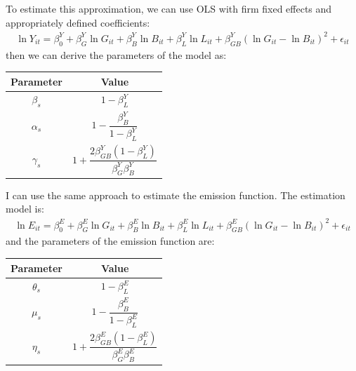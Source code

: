 \documentclass[12pt]{article} %
\begin{document}
To estimate this approximation, we can use OLS with firm fixed effects and appropriately defined coefficients:
\begin{gather*}
    \ln Y_{it} = \beta_0^Y + \beta_G^Y \ln G_{it} + \beta_B^Y \ln B_{it} + \beta_L^Y \ln L_{it} + \beta_{GB}^Y (\ln G_{it} - \ln B_{it})^2 + \epsilon_{it}
\end{gather*}
then we can derive the parameters of the model as:
\begin{table}[http]
    \centering
    \begin{tabular}{cc}
        \hline
        \textbf{Parameter} & \textbf{Value} \\
        \hline
        $\beta_{s}$ & $1-\beta_L^Y$ \vspace{5pt}
        \\
        $\alpha_{s}$ & $1-\dfrac{\beta_B^Y}{1-\beta_L^Y}$ \vspace{5pt}
        \\
        $\gamma_{s}$ & $1+\dfrac{2\beta_{GB}^Y(1-\beta_L^Y)}{\beta_G^Y\beta_B^Y}$ \vspace{5pt}
        \\
        \hline
    \end{tabular}
\end{table}

I can use the same approach to estimate the emission function. The estimation model is:
\begin{gather*}
    \ln E_{it} = \beta_0^E + \beta_G^E \ln G_{it} + \beta_B^E \ln B_{it} + \beta_L^E \ln L_{it} + \beta_{GB}^E (\ln G_{it} - \ln B_{it})^2 + \epsilon_{it}
\end{gather*}
and the parameters of the emission function are:
\begin{table}[http]
    \centering
    \begin{tabular}{cc}
        \hline
        \textbf{Parameter} & \textbf{Value} \\
        \hline
        $\theta_{s}$ & $1-\beta_L^E$ \vspace{5pt}
        \\
        $\mu_{s}$ & $1-\dfrac{\beta_B^E}{1-\beta_L^E}$ \vspace{5pt}
        \\
        $\eta_{s}$ & $1+\dfrac{2\beta_{GB}^E(1-\beta_L^E)}{\beta_G^E\beta_B^E}$ \vspace{5pt}
        \\
        \hline
    \end{tabular}
\end{table}
\end{document}
